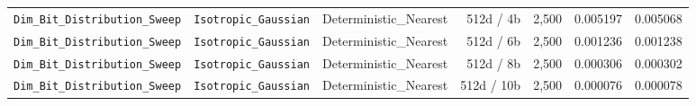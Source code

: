 \begin{table}[t]
{\begin{tabular}{@{}lllrrrr@{}}
\texttt{Dim\_Bit\_Distribution\_Sweep} & \texttt{Isotropic\_Gaussian} & Deterministic\_Nearest & 512d / 4b & 2,500 & 0.005197 & 0.005068 \\
\texttt{Dim\_Bit\_Distribution\_Sweep} & \texttt{Isotropic\_Gaussian} & Deterministic\_Nearest & 512d / 6b & 2,500 & 0.001236 & 0.001238 \\
\texttt{Dim\_Bit\_Distribution\_Sweep} & \texttt{Isotropic\_Gaussian} & Deterministic\_Nearest & 512d / 8b & 2,500 & 0.000306 & 0.000302 \\
\texttt{Dim\_Bit\_Distribution\_Sweep} & \texttt{Isotropic\_Gaussian} & Deterministic\_Nearest & 512d / 10b & 2,500 & 0.000076 & 0.000078 \\
\bottomrule
\end{tabular}%
}
\end{table}
